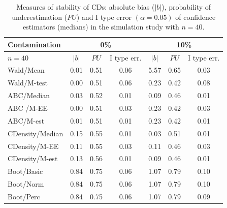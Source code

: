 \documentclass[preprint,12pt,authoryear]{elsarticle}
\begin{document}
\begin{table}[h!]
\centering
\begin{tabular}{ |l|c|c|c|c|c|c|}
  \hline
  Contamination &\multicolumn{3}{c|}{0\%} & \multicolumn{3}{c|}{10\%}   \\  
\hline
  $n=40$ & $|b|$ & $PU$   & I type err.& $|b|$ & $PU$ & I type err.\\ 
  \hline
  Wald/Mean & 0.01  & 0.51  &  0.06  & 5.57   & 0.65 &  0.03\\ 
  Wald/M-test & 0.00  &   0.51 & 0.06 & 0.23  &  0.42& 0.08  \\ 
ABC/Median  & 0.03 &    0.52& 0.01& 0.09  & 0.46 & 0.01 \\ 
  ABC /M-EE  &  0.00 &  0.51  &0.03 & 0.23  & 0.42 & 0.03 \\ 
   ABC/M-est  &  0.01&   0.51 & 0.01& 0.23  & 0.42 & 0.01  \\ 
CDensity/Median  &  0.15&  0.55  &0.01 &  0.03 & 0.51  & 0.01 \\ 
   CDensity/M-EE  &  0.11&   0.55 &0.03 & 0.11  &  0.46& 0.03 \\ 
   CDensity/M-est  &0.13  &0.56    & 0.01& 0.09  &  0.46&0.01  \\ 
Boot/Basic &0.84&0.75&0.06&1.07&0.79&0.10\\
Boot/Norm &0.84&0.75&0.06&1.07&0.79&0.10\\
Boot/Perc&0.84&0.75&0.06&1.07&0.79&0.09\\
   \hline
\end{tabular}
\caption{Measures of stability of CDs: absolute bias ($|b|$), probability of underestimation ($PU$) and I type error $(\alpha=0.05)$ of confidence estimators (medians) in the simulation study with $n=40$.}
\label{sim40}
\end{table}
\end{document}
